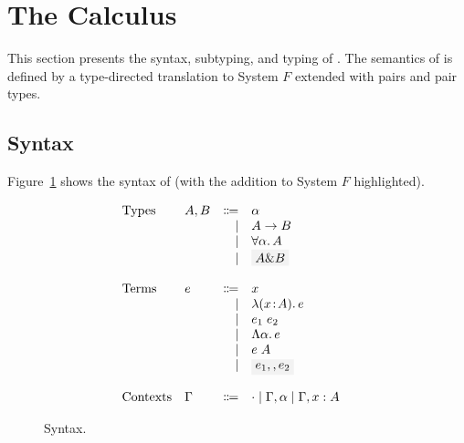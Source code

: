 \section{The \namenaive Calculus} \label{sec:finaive}

This section presents the syntax, subtyping, and typing of \namenaive. The
semantics of \namenaive is defined by a type-directed translation to System $F$ extended with pairs and pair types.

\subsection{Syntax}

Figure~\ref{fig:finaive-syntax} shows the syntax of \namenaive (with the
addition to System $F$ highlighted).


\begin{figure}[h]
  \[
    \begin{array}{l}
      \begin{array}{llrll}
        \text{Types}
        & A, B & \Coloneqq & \alpha      & \\
        &      & \mid & A \to B          & \\
        &      & \mid & \for {\alpha} A  & \\
        &      & \mid & \highlight{$ A \inter B $}  & \\

        \\
        \text{Terms}
        & e & \Coloneqq & x            & \\
        &   & \mid & \lamty x A e      & \\
        &   & \mid & \app {e_1} {e_2}  & \\
        &   & \mid & \blam {\alpha} e  & \\
        &   & \mid & \tapp e A         & \\
        &   & \mid & \highlight{$ e_1 \mergeop e_2 $}  & \\

        \\
        \text{Contexts}
        & \Gamma & \Coloneqq & \cdot
                   \mid \Gamma, \alpha
                   \mid \Gamma, x : A  & \\
      \end{array}
    \end{array}
  \]

  \label{fig:finaive-syntax}
  \caption{Syntax.}
\end{figure}

